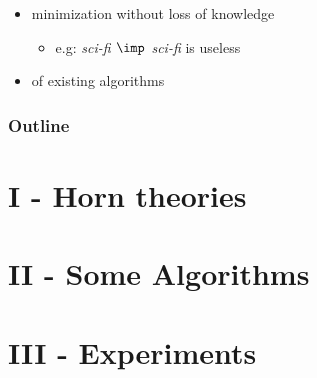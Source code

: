 \documentclass{beamer}
\begin{document}
{{\begin{frame}
\begin{itemize}
	\vspace{1.2em}
	
	\item minimization without loss of knowledge
	\begin{itemize}
		\item[] {\color{midnight} e.g: \textit{sci-fi $\imp$ sci-fi} is useless}
	\end{itemize}
	
	\vspace{1.2em}
	
	\item {} of existing algorithms
\end{itemize}

\end{frame}



\begin{frame}
\frametitle{Outline}
\tableofcontents

\end{frame}
}}



\section{I - Horn theories}


\section{II - Some Algorithms}


\section{III - Experiments}

\end{document}
